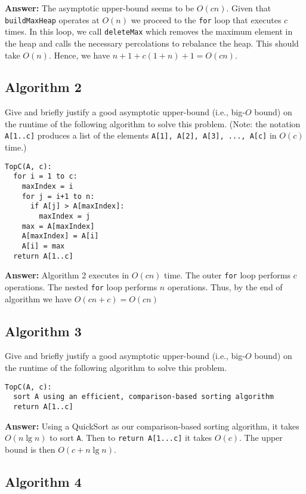 \documentclass[11pt, oneside]{article}   	%
\theoremstyle{definition}
\theoremstyle{remark}
\begin{document}
\textbf{Answer: }The asymptotic upper-bound seems to be $O(cn)$. Given that \texttt{buildMaxHeap} operates at $O(n)$ we proceed to the \texttt{for} loop that executes $c$ times. In this loop, we call \texttt{deleteMax} which removes the maximum element in the heap and calls the necessary percolations to rebalance the heap. This should take $O(n)$. Hence, we have $n+1+c(1+n)+1 = O(cn)$.

\subsection{Algorithm 2}

Give and briefly justify a good asymptotic upper-bound (i.e., big-$O$
bound) on the runtime of the following algorithm to solve this
problem. (Note: the notation \texttt{A[1..c]} produces a list of the elements
\texttt{A[1], A[2], A[3], ..., A[c]} in $O(c)$ time.)

\begin{verbatim}
TopC(A, c):
  for i = 1 to c:
    maxIndex = i
    for j = i+1 to n:
      if A[j] > A[maxIndex]:
        maxIndex = j
    max = A[maxIndex]
    A[maxIndex] = A[i]
    A[i] = max
  return A[1..c]
\end{verbatim}

\textbf{Answer: }Algorithm 2 executes in $O(cn)$ time. The outer \texttt{for} loop  performs $c$ operations. The nested \texttt{for} loop performs  $n$ operations. Thus, by the end of algorithm we have $O(cn + c) = O(cn)$
\subsection{Algorithm 3}

Give and briefly justify a good asymptotic upper-bound (i.e., big-$O$
bound) on the runtime of the following algorithm to solve this
problem.

\begin{verbatim}
TopC(A, c):
  sort A using an efficient, comparison-based sorting algorithm
  return A[1..c]
\end{verbatim}

\textbf{Answer: }Using a QuickSort as our comparison-based sorting algorithm, it takes $O(n \lg n)$ to sort \texttt{A}. Then to \texttt{return A[1...c]} it takes $O(c)$. The upper bound is then $O(c+n \lg n)$.  
\subsection{Algorithm 4}
\end{document}
